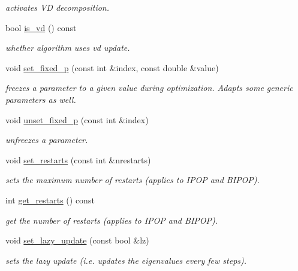 \begin{DoxyCompactItemize}
\begin{DoxyCompactList}\small\item\em activates V\-D decomposition. \end{DoxyCompactList}\item 
bool \hyperlink{classlibcmaes_1_1CMAParameters_a9890c37acc093a449fa36750241f22fd}{is\-\_\-vd} () const 
\begin{DoxyCompactList}\small\item\em whether algorithm uses vd update. \end{DoxyCompactList}\item 
void \hyperlink{classlibcmaes_1_1CMAParameters_a73af8cdc07dc3388c40a27ddbdea96b4}{set\-\_\-fixed\-\_\-p} (const int \&index, const double \&value)
\begin{DoxyCompactList}\small\item\em freezes a parameter to a given value during optimization. Adapts some generic parameters as well. \end{DoxyCompactList}\item 
void \hyperlink{classlibcmaes_1_1CMAParameters_adb4f043e62081a8910d54f87db3b6ef4}{unset\-\_\-fixed\-\_\-p} (const int \&index)
\begin{DoxyCompactList}\small\item\em unfreezes a parameter. \end{DoxyCompactList}\item 
void \hyperlink{classlibcmaes_1_1CMAParameters_a105789bdd00467411107db57302028f2}{set\-\_\-restarts} (const int \&nrestarts)
\begin{DoxyCompactList}\small\item\em sets the maximum number of restarts (applies to I\-P\-O\-P and B\-I\-P\-O\-P). \end{DoxyCompactList}\item 
int \hyperlink{classlibcmaes_1_1CMAParameters_aee2680a27ebcf7f9129e3254a70b356a}{get\-\_\-restarts} () const 
\begin{DoxyCompactList}\small\item\em get the number of restarts (applies to I\-P\-O\-P and B\-I\-P\-O\-P). \end{DoxyCompactList}\item 
void \hyperlink{classlibcmaes_1_1CMAParameters_a0633711fb573b719cf698a9844d9d4f6}{set\-\_\-lazy\-\_\-update} (const bool \&lz)
\begin{DoxyCompactList}\small\item\em sets the lazy update (i.\-e. updates the eigenvalues every few steps). \end{DoxyCompactList}\item 

\end{DoxyCompactItemize}
